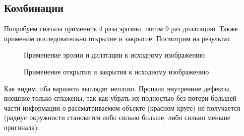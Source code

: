 \documentclass[a4paper, 12pt]{article}
\begin{document}
    \subsection{Комбинации}
    Попробуем сначала применить 4 раза эрозию, потом 9 раз дилатацию. Также применим последовательно открытие и закрытие. Посмотрим на результат.
    \begin{figure}[H]
        \centering
        \captionsetup{skip=0pt}
        \caption{Применение эрозии и дилатации к исходному изображению}
        \label{fig:erdil1}
    \end{figure}
    \begin{figure}[H]
        \centering
        \captionsetup{skip=0pt}
        \caption{Применение открытия и закрытия к исходному изображению}
        \label{fig:opcl1}
    \end{figure}
    Как видим, оба варианта выглядят неплохо. Пропали внутренние дефекты, внешние только сглажены, так как убрать их
    полностью без потери большей части информации о рассматриваемом объекте (красном круге) не получается (радиус окружности
    становится либо сильно больше, либо сильно меньше оригинала).
\end{document}
